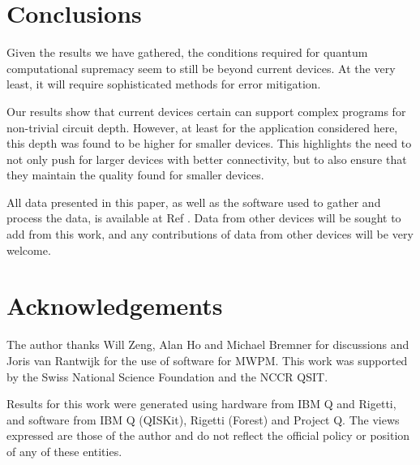 \documentclass[aps,prl,twocolumn,showpacs,preprintnumbers]{revtex4-1}
\begin{document}
\section{Conclusions}

Given the results we have gathered, the conditions required for quantum computational supremacy seem to still be beyond current devices. At the very least, it will require sophisticated methods for error mitigation.

Our results show that current devices certain can support complex programs for non-trivial circuit depth. However, at least for the application considered here, this depth was found to be higher for smaller devices. This highlights the need to not only push for larger devices with better connectivity, but to also ensure that they maintain the quality found for smaller devices.

All data presented in this paper, as well as the software used to gather and process the data, is available at Ref \cite{awesomeness}. Data from other devices will be sought to add from this work, and any contributions of data from other devices will be very welcome.


\section{Acknowledgements}

The author thanks Will Zeng, Alan Ho and Michael Bremner for discussions and Joris van Rantwijk for the use of software for MWPM. This work was supported by the Swiss National Science Foundation and the NCCR QSIT.

Results for this work were generated using hardware from IBM Q and Rigetti, and software from IBM Q (QISKit), Rigetti (Forest) and Project Q. The views expressed are those of the author and do not reflect the official policy or position of any of these entities.





\pagebreak
\end{document}
